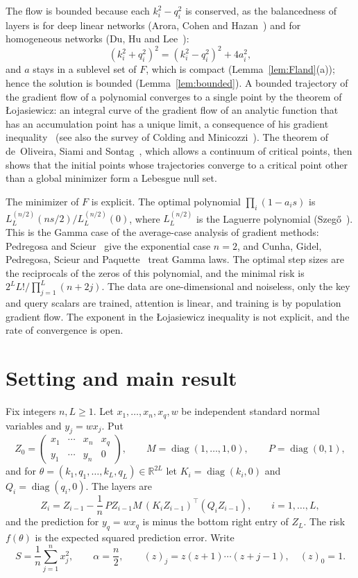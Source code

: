 \documentclass[11pt]{amsart}
\theoremstyle{remark}
\numberwithin{equation}{section}
\newcommand{\RR}{\mathbb{R}}
\begin{document}
The flow is bounded because each $k_i^2-q_i^2$ is conserved, as the balancedness of layers is for deep linear networks (Arora, Cohen and Hazan~\cite{ACH}) and for homogeneous networks (Du, Hu and Lee~\cite{DHL}):
\[
(k_i^2+q_i^2)^2=(k_i^2-q_i^2)^2+4a_i^2,
\]
and $a$ stays in a sublevel set of $F$, which is compact (Lemma~\ref{lem:Fland}(a)); hence the solution is bounded (Lemma~\ref{lem:bounded}). A bounded trajectory of the gradient flow of a polynomial converges to a single point by the theorem of \L{}ojasiewicz: an integral curve of the gradient flow of an analytic function that has an accumulation point has a unique limit, a consequence of his gradient inequality~\cite{Loj63,Loj84} (see also the survey of Colding and Minicozzi~\cite{ColdingMinicozzi}). The theorem of de~Oliveira, Siami and Sontag~\cite{OSS}, which allows a continuum of critical points, then shows that the initial points whose trajectories converge to a critical point other than a global minimizer form a Lebesgue null set.

The minimizer of $F$ is explicit. The optimal polynomial $\prod_i(1-a_is)$ is $L_L^{(n/2)}(ns/2)/L_L^{(n/2)}(0)$, where $L_L^{(n/2)}$ is the Laguerre polynomial (Szeg\H{o}~\cite{Szego}). This is the Gamma case of the average-case analysis of gradient methods: Pedregosa and Scieur~\cite{PS} give the exponential case $n=2$, and Cunha, Gidel, Pedregosa, Scieur and Paquette~\cite[Theorem~4.6]{CGPSP} treat Gamma laws. The optimal step sizes are the reciprocals of the zeros of this polynomial, and the minimal risk is $2^LL!/\prod_{j=1}^{L}(n+2j)$. The data are one-dimensional and noiseless, only the key and query scalars are trained, attention is linear, and training is by population gradient flow. The exponent in the \L{}ojasiewicz inequality is not explicit, and the rate of convergence is open.

\section{Setting and main result}\label{sec:setting}
Fix integers $n,L\ge1$. Let $x_1,\dots,x_n,x_q,w$ be independent standard normal variables and $y_j=wx_j$. Put
\[
Z_0=\begin{pmatrix}x_1&\cdots&x_n&x_q\\ y_1&\cdots&y_n&0\end{pmatrix},\qquad
M=\operatorname{diag}(1,\dots,1,0),\qquad P=\operatorname{diag}(0,1),
\]
and for $\theta=(k_1,q_1,\dots,k_L,q_L)\in\RR^{2L}$ let $K_i=\operatorname{diag}(k_i,0)$ and $Q_i=\operatorname{diag}(q_i,0)$. The layers are
\begin{equation}\label{eq:layer}
Z_i=Z_{i-1}-\frac1n\,PZ_{i-1}M\,(K_iZ_{i-1})^{\top}(Q_iZ_{i-1}),\qquad i=1,\dots,L,
\end{equation}
and the prediction for $y_q=wx_q$ is minus the bottom right entry of $Z_L$. The risk $f(\theta)$ is the expected squared prediction error. Write
\[
S=\frac1n\sum_{j=1}^{n}x_j^2,\qquad \alpha=\frac n2,\qquad (z)_j=z(z+1)\cdots(z+j-1),\quad (z)_0=1.
\]
\end{document}
